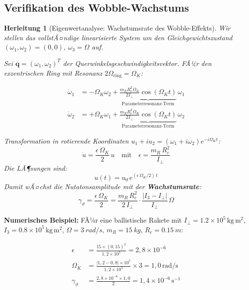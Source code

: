 ﻿\documentclass[12pt,a4paper]{article}
\newtheorem{herleitung}{Herleitung}[section]
\newcommand{\vek}[1]{\boldsymbol{#1}}
\begin{document}
\subsection{Verifikation des Wobble-Wachstums}

\begin{herleitung}[Eigenwertanalyse: Wachstumsrate des Wobble-Effekts]
Wir stellen das vollstÃ¤ndige linearisierte System um den Gleichgewichtszustand
$(\omega_1, \omega_2) = (0,0)$, $\omega_3 = \Omega$ auf.

Sei $\vek{q} = (\omega_1, \omega_2)^T$ der Querwinkelsgeschwindigkeitsvektor.
FÃ¼r den exzentrischen Ring mit Resonanz $2\Omega_{\mathrm{ring}} = \Omega_K$:

\begin{align*}
  \dot{\omega}_1 &= -\Omega_K\omega_2 + \underbrace{\frac{m_R R_e^2 \Omega_K}{2 I_\perp}
    \cos(\Omega_K t)}_{\text{Parameterresonanz-Term}}\,\omega_1\\
  \dot{\omega}_2 &= +\Omega_K\omega_1 + \underbrace{\frac{m_R R_e^2 \Omega_K}{2 I_\perp}
    \cos(\Omega_K t)}_{\text{Parameterresonanz-Term}}\,\omega_2
\end{align*}

Transformation in rotierende Koordinaten $u_1 + iu_2 = (\omega_1+i\omega_2)e^{-i\Omega_K t}$:
\[
  \dot{u} = \frac{\epsilon\,\Omega_K}{2}\,u \quad\text{mit}\quad
  \epsilon = \frac{m_R\,R_e^2}{I_\perp}
\]
Die LÃ¶sungen sind:
\[
  u(t) = u_0\,e^{(\epsilon\,\Omega_K/2)\,t}
\]
Damit wÃ¤chst die Nutatonsamplitude mit der \textbf{Wachstumsrate}:
\[
  \boxed{\gamma_\vartheta = \frac{\epsilon\,\Omega_K}{2}
    = \frac{m_R\,R_e^2}{2\,I_\perp}\cdot\frac{|I_3-I_\perp|}{I_\perp}\,\Omega}
\]
\end{herleitung}

\textbf{Numerisches Beispiel:} FÃ¼r eine ballistische Rakete mit
$I_\perp = 1.2\times10^5\,\mathrm{kg\,m^2}$,
$I_3 = 0.8\times10^5\,\mathrm{kg\,m^2}$,
$\Omega = \SI{3}{rad/s}$, $m_R = \SI{15}{kg}$, $R_e = \SI{0.15}{m}$:

\begin{align*}
  \epsilon   &= \frac{15 \times (0{,}15)^2}{1{,}2\times10^5} = 2{,}8\times10^{-6}\\
  \Omega_K   &= \frac{|1{,}2-0{,}8|\times10^5}{1{,}2\times10^5}\times 3
               = 1{,}0\,\mathrm{rad/s}\\
  \gamma_\vartheta &= \frac{2{,}8\times10^{-6}\times1{,}0}{2} = 1{,}4\times10^{-6}\,\mathrm{s}^{-1}
\end{align*}
\end{document}
